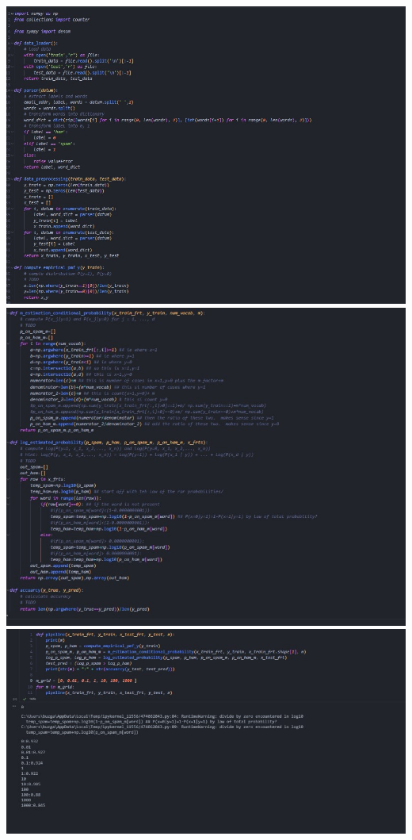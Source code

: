 \documentclass[12pt,twoside]{article}
\begin{document}
\begin{enumerate}
\begin{enumerate}
\begin{itemize}
  \end{itemize}
  \\\includegraphics[width=15cm]{homework 6/homework 6 immage 2.png.jpg}
  \\\includegraphics[width=15cm]{homework 6/homework 6 immage 3.png.jpg}
  \\\includegraphics[width=15cm]{homework 6/homework 6 immage 4.png.jpg}
  
 
\end{enumerate}


\end{enumerate}
\end{document}
